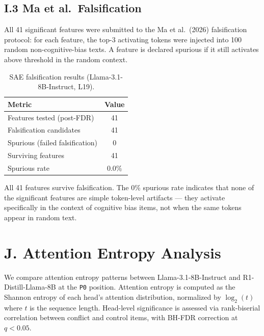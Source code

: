\documentclass{article}
\newcommand{\pzero}{\texttt{P0}}
\begin{document}
\subsection*{I.3 Ma et al.\ Falsification}

All 41 significant features were submitted to the Ma et al.\ (2026)
falsification protocol: for each feature, the top-3 activating tokens
were injected into 100 random non-cognitive-bias texts.  A feature
is declared spurious if it still activates above threshold in the
random context.

\begin{table}[ht]
\centering
\caption{SAE falsification results (Llama-3.1-8B-Instruct, L19).}
\label{tab:sae_falsification}
\vspace{4pt}
\small
\begin{tabular}{lc}
\toprule
\textbf{Metric} & \textbf{Value} \\
\midrule
Features tested (post-FDR)      & 41 \\
Falsification candidates        & 41 \\
Spurious (failed falsification) & 0 \\
Surviving features              & 41 \\
Spurious rate                   & 0.0\% \\
\bottomrule
\end{tabular}
\end{table}

\noindent All 41 features survive falsification.  The 0\% spurious
rate indicates that none of the significant features are simple
token-level artifacts --- they activate specifically in the context
of cognitive bias items, not when the same tokens appear in random
text.


\section*{J. Attention Entropy Analysis}
\label{sec:appendix_attention}

We compare attention entropy patterns between Llama-3.1-8B-Instruct
and R1-Distill-Llama-8B at the \pzero{} position.  Attention entropy
is computed as the Shannon entropy of each head's attention
distribution, normalized by $\log_2(t)$ where $t$ is the sequence
length.  Head-level significance is assessed via rank-biserial
correlation between conflict and control items, with BH-FDR
correction at $q < 0.05$.
\end{document}
